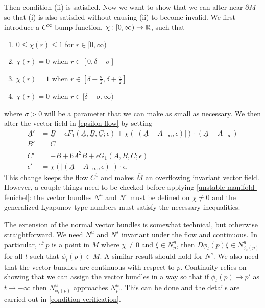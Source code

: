 Then condition (ii) is satisfied. Now we want to show that we can alter near \(\partial M\) so that (i) is also satisfied without causing (ii) to become invalid. We first introduce a \(C^\infty\) bump function, \(\chi:[0, \infty) \to \mathbb{R}\), such that 
\begin{enumerate}[label = (\arabic*)]
	\item \(0\leq \chi(r) \leq 1\) for \(r \in[0,\infty)\)
	\item \(\chi(r) = 0\) when \(r\in [0, \delta -\sigma]\)
	\item \(\chi(r) = 1\) when \(r\in [\delta - \frac \sigma 2 , \delta + \frac \sigma 2]\)
	\item \(\chi(r) = 0\) when \(r\in [\delta +\sigma,\infty)\)
\end{enumerate}
where \(\sigma > 0\) will be a parameter that we can make as small as necessary. We then alter the vector field in \cref{epsilon-flow} by setting
\begin{equation}
\begin{aligned}
	\underline A ' &= \underline B + \epsilon F_1(\underline A, \underline B, \underline C;\epsilon) + \chi( |(\underline A - A_{-\infty},  \epsilon)|) \cdot (\underline A - A_{-\infty}) \\
	\underline B' &= \underline C \\
	\underline C ' &= - \underline B + 6 \underline A^2 \underline B + \epsilon G_1(\underline A, \underline B, \underline C;\epsilon) \\
	\epsilon' &= \chi( |(\underline A - A_{-\infty},  \epsilon)|) \cdot \epsilon.
\end{aligned}
\end{equation}
This change keeps the flow \(C^1\) and makes \(\overline M\) an overflowing invariant vector field. However, a couple things need to be checked before applying \cref{unstable-manifold-fenichel}: the vector bundles \(N^u\) and \(N^s\) must be defined on \(\chi \neq 0\) and the generalized Lyapunov-type numbers must satisfy the necessary inequalities.

The extension of the normal vector bundles is somewhat technical, but otherwise straightforward. We need \(N^u\) and \(N^s\) invariant under the flow and continuous. In particular, if \(p\) is a point in \(M\) where \(\chi \neq 0\) and \(\xi \in N^u_p\), then \(D\phi_t(p) \xi \in N^u_{\phi_t(p)}\) for all \(t\) such that \(\phi_t(p) \in M\). A similar result should hold for \(N^s\). We also need that the vector bundles are continuous with respect to \(p\). Continuity relies on showing that we can assign the vector bundles in a way so that if \(\phi_t(p) \to p'\) as \(t\to-\infty\) then \(N^u_{\phi_t(p)}\) approaches \(N^u_{p'}\). This can be done and the details are carried out in \cref{condition-verification}.

